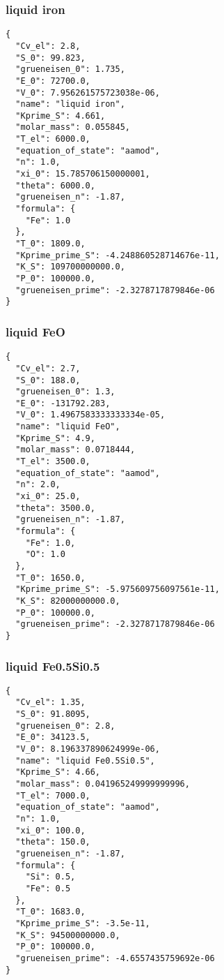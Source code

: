 \documentclass[11pt,a4paper,english]{article}
\begin{document}
\subsubsection{liquid iron}
\begin{lstlisting}
{
  "Cv_el": 2.8, 
  "S_0": 99.823, 
  "grueneisen_0": 1.735, 
  "E_0": 72700.0, 
  "V_0": 7.956261575723038e-06, 
  "name": "liquid iron", 
  "Kprime_S": 4.661, 
  "molar_mass": 0.055845, 
  "T_el": 6000.0, 
  "equation_of_state": "aamod", 
  "n": 1.0, 
  "xi_0": 15.785706150000001, 
  "theta": 6000.0, 
  "grueneisen_n": -1.87, 
  "formula": {
    "Fe": 1.0
  }, 
  "T_0": 1809.0, 
  "Kprime_prime_S": -4.248860528714676e-11, 
  "K_S": 109700000000.0, 
  "P_0": 100000.0, 
  "grueneisen_prime": -2.3278717879846e-06
}
\end{lstlisting}

\subsubsection{liquid FeO}
\begin{lstlisting}
{
  "Cv_el": 2.7, 
  "S_0": 188.0, 
  "grueneisen_0": 1.3, 
  "E_0": -131792.283, 
  "V_0": 1.4967583333333334e-05, 
  "name": "liquid FeO", 
  "Kprime_S": 4.9, 
  "molar_mass": 0.0718444, 
  "T_el": 3500.0, 
  "equation_of_state": "aamod", 
  "n": 2.0, 
  "xi_0": 25.0, 
  "theta": 3500.0, 
  "grueneisen_n": -1.87, 
  "formula": {
    "Fe": 1.0, 
    "O": 1.0
  }, 
  "T_0": 1650.0, 
  "Kprime_prime_S": -5.975609756097561e-11, 
  "K_S": 82000000000.0, 
  "P_0": 100000.0, 
  "grueneisen_prime": -2.3278717879846e-06
}
\end{lstlisting}

\subsubsection{liquid Fe0.5Si0.5}
\begin{lstlisting}
{
  "Cv_el": 1.35, 
  "S_0": 91.8095, 
  "grueneisen_0": 2.8, 
  "E_0": 34123.5, 
  "V_0": 8.196337890624999e-06, 
  "name": "liquid Fe0.5Si0.5", 
  "Kprime_S": 4.66, 
  "molar_mass": 0.041965249999999996, 
  "T_el": 7000.0, 
  "equation_of_state": "aamod", 
  "n": 1.0, 
  "xi_0": 100.0, 
  "theta": 150.0, 
  "grueneisen_n": -1.87, 
  "formula": {
    "Si": 0.5, 
    "Fe": 0.5
  }, 
  "T_0": 1683.0, 
  "Kprime_prime_S": -3.5e-11, 
  "K_S": 94500000000.0, 
  "P_0": 100000.0, 
  "grueneisen_prime": -4.6557435759692e-06
}
\end{lstlisting}
\end{document}
